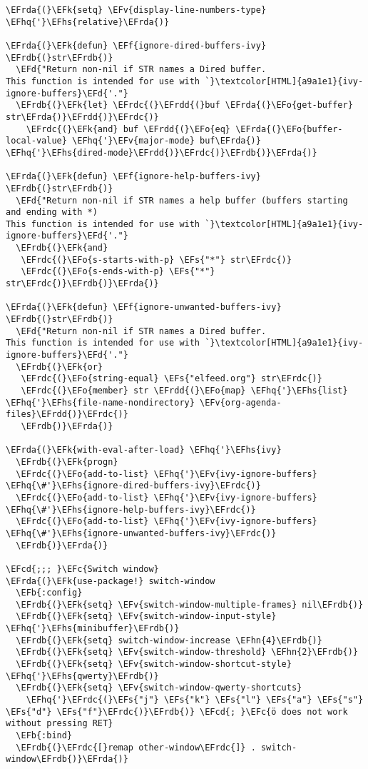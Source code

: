 \documentclass[a4wide,10pt]{article}
\newcommand{\EFc}[1]{\textcolor{EFc}{#1}} %
\newcommand{\EFcd}[1]{\textcolor{EFcd}{#1}} %
\newcommand{\EFs}[1]{\textcolor{EFs}{#1}} %
\newcommand{\EFd}[1]{\textcolor{EFd}{#1}} %
\newcommand{\EFk}[1]{\textcolor{EFk}{#1}} %
\newcommand{\EFb}[1]{\textcolor{EFb}{#1}} %
\newcommand{\EFf}[1]{\textcolor{EFf}{#1}} %
\newcommand{\EFv}[1]{\textcolor{EFv}{#1}} %
\newcommand{\EFo}[1]{\textcolor{EFo}{#1}} %
\newcommand{\EFhn}[1]{\textcolor{EFhn}{\textbf{#1}}} %
\newcommand{\EFhq}[1]{\textcolor{EFhq}{#1}} %
\newcommand{\EFhs}[1]{\textcolor{EFhs}{#1}} %
\newcommand{\EFrda}[1]{\textcolor{EFrda}{#1}} %
\newcommand{\EFrdb}[1]{\textcolor{EFrdb}{#1}} %
\newcommand{\EFrdc}[1]{\textcolor{EFrdc}{#1}} %
\newcommand{\EFrdd}[1]{\textcolor{EFrdd}{#1}} %
\begin{document}
\begin{Code}
\begin{Verbatim}
\EFrda{(}\EFk{setq} \EFv{display-line-numbers-type} \EFhq{'}\EFhs{relative}\EFrda{)}

\EFrda{(}\EFk{defun} \EFf{ignore-dired-buffers-ivy} \EFrdb{(}str\EFrdb{)}
  \EFd{"Return non-nil if STR names a Dired buffer.
This function is intended for use with `}\textcolor[HTML]{a9a1e1}{ivy-ignore-buffers}\EFd{'."}
  \EFrdb{(}\EFk{let} \EFrdc{(}\EFrdd{(}buf \EFrda{(}\EFo{get-buffer} str\EFrda{)}\EFrdd{)}\EFrdc{)}
    \EFrdc{(}\EFk{and} buf \EFrdd{(}\EFo{eq} \EFrda{(}\EFo{buffer-local-value} \EFhq{'}\EFv{major-mode} buf\EFrda{)} \EFhq{'}\EFhs{dired-mode}\EFrdd{)}\EFrdc{)}\EFrdb{)}\EFrda{)}

\EFrda{(}\EFk{defun} \EFf{ignore-help-buffers-ivy} \EFrdb{(}str\EFrdb{)}
  \EFd{"Return non-nil if STR names a help buffer (buffers starting and ending with *)
This function is intended for use with `}\textcolor[HTML]{a9a1e1}{ivy-ignore-buffers}\EFd{'."}
  \EFrdb{(}\EFk{and}
   \EFrdc{(}\EFo{s-starts-with-p} \EFs{"*"} str\EFrdc{)}
   \EFrdc{(}\EFo{s-ends-with-p} \EFs{"*"} str\EFrdc{)}\EFrdb{)}\EFrda{)}

\EFrda{(}\EFk{defun} \EFf{ignore-unwanted-buffers-ivy} \EFrdb{(}str\EFrdb{)}
  \EFd{"Return non-nil if STR names a Dired buffer.
This function is intended for use with `}\textcolor[HTML]{a9a1e1}{ivy-ignore-buffers}\EFd{'."}
  \EFrdb{(}\EFk{or}
   \EFrdc{(}\EFo{string-equal} \EFs{"elfeed.org"} str\EFrdc{)}
   \EFrdc{(}\EFo{member} str \EFrdd{(}\EFo{map} \EFhq{'}\EFhs{list} \EFhq{'}\EFhs{file-name-nondirectory} \EFv{org-agenda-files}\EFrdd{)}\EFrdc{)}
   \EFrdb{)}\EFrda{)}

\EFrda{(}\EFk{with-eval-after-load} \EFhq{'}\EFhs{ivy}
  \EFrdb{(}\EFk{progn}
  \EFrdc{(}\EFo{add-to-list} \EFhq{'}\EFv{ivy-ignore-buffers} \EFhq{\#'}\EFhs{ignore-dired-buffers-ivy}\EFrdc{)}
  \EFrdc{(}\EFo{add-to-list} \EFhq{'}\EFv{ivy-ignore-buffers} \EFhq{\#'}\EFhs{ignore-help-buffers-ivy}\EFrdc{)}
  \EFrdc{(}\EFo{add-to-list} \EFhq{'}\EFv{ivy-ignore-buffers} \EFhq{\#'}\EFhs{ignore-unwanted-buffers-ivy}\EFrdc{)}
  \EFrdb{)}\EFrda{)}

\EFcd{;;; }\EFc{Switch window}
\EFrda{(}\EFk{use-package!} switch-window
  \EFb{:config}
  \EFrdb{(}\EFk{setq} \EFv{switch-window-multiple-frames} nil\EFrdb{)}
  \EFrdb{(}\EFk{setq} \EFv{switch-window-input-style} \EFhq{'}\EFhs{minibuffer}\EFrdb{)}
  \EFrdb{(}\EFk{setq} switch-window-increase \EFhn{4}\EFrdb{)}
  \EFrdb{(}\EFk{setq} \EFv{switch-window-threshold} \EFhn{2}\EFrdb{)}
  \EFrdb{(}\EFk{setq} \EFv{switch-window-shortcut-style} \EFhq{'}\EFhs{qwerty}\EFrdb{)}
  \EFrdb{(}\EFk{setq} \EFv{switch-window-qwerty-shortcuts}
	\EFhq{'}\EFrdc{(}\EFs{"j"} \EFs{"k"} \EFs{"l"} \EFs{"a"} \EFs{"s"} \EFs{"d"} \EFs{"f"}\EFrdc{)}\EFrdb{)} \EFcd{; }\EFc{ö does not work without pressing RET}
  \EFb{:bind}
  \EFrdb{(}\EFrdc{[}remap other-window\EFrdc{]} . switch-window\EFrdb{)}\EFrda{)}


\end{Verbatim}
\end{Code}
\end{document}

